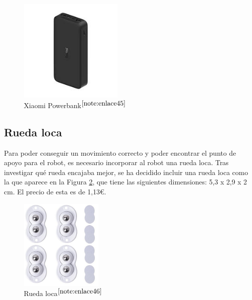 \begin{figure} [h!]
	\begin{center}
		\includegraphics[width=5cm]{figs/powerbank.png}
	\end{center}
	\caption{Xiaomi Powerbank$^{\ref{note:enlace45}}$} 
	\label{fig:powerbank}
\end{figure}

\setcounter{footnote}{45} %

\subsection{Rueda loca}

Para poder conseguir un movimiento correcto y poder encontrar el punto de apoyo para el robot, es necesario incorporar al robot una rueda loca. Tras investigar qué rueda encajaba mejor, se ha decidido incluir una rueda loca como la que aparece en la Figura \ref{fig:ruedaloca}, que tiene las siguientes dimensiones: 5,3 x 2,9 x 2 cm. El precio de esta es de 1,13€.

\begin{figure} [h!]
	\begin{center}
		\includegraphics[width=4cm]{figs/ruedaloca.png}
	\end{center}
	\caption{Rueda loca$^{\ref{note:enlace46}}$} 
	\label{fig:ruedaloca}
\end{figure}

\setcounter{footnote}{46} %

